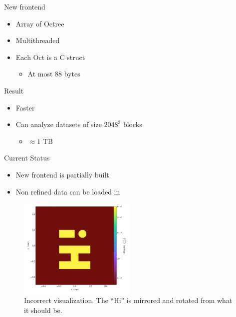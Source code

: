\documentclass[
  ignorenonframetext,
]{beamer}
\providecommand{\tightlist}{%
  \setlength{\itemsep}{0pt}\setlength{\parskip}{0pt}}
\begin{document}
\begin{frame}{New frontend}
\protect\hypertarget{new-frontend}{}
\begin{itemize}
\tightlist
\item
  Array of Octree
\item
  Multithreaded
\item
  Each Oct is a C struct

  \begin{itemize}
  \tightlist
  \item
    At most 88 bytes
  \end{itemize}
\end{itemize}
\end{frame}

\begin{frame}{Result}
\protect\hypertarget{result}{}
\begin{itemize}
\tightlist
\item
  Faster
\item
  Can analyze datasets of size \(2048^3\) blocks

  \begin{itemize}
  \tightlist
  \item
    \(\approx 1\) TB
  \end{itemize}
\end{itemize}
\end{frame}

\begin{frame}{Current Status}
\protect\hypertarget{current-status}{}
\begin{itemize}
\tightlist
\item
  New frontend is partially built
\item
  Non refined data can be loaded in
\end{itemize}

\begin{figure}
\centering
\includegraphics[width=0.5\textwidth,height=0.5\textheight]{new2.jpg}
\caption{Incorrect visualization. The ``Hi'' is mirrored and rotated
from what it should be.}
\end{figure}
\end{frame}
\end{document}
